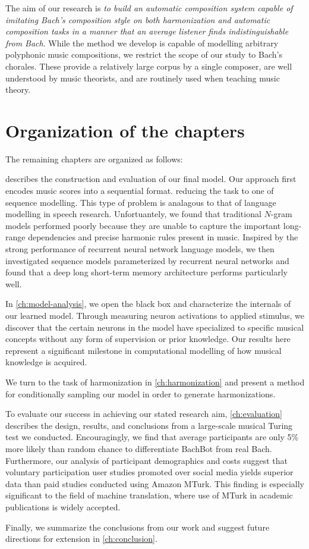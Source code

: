 The aim of our research is \emph{to build an automatic composition system
capable of imitating Bach's composition style on both harmonization and
automatic composition tasks in a manner that an average listener finds
indistinguishable from Bach}. While the method we develop is capable of
modelling arbitrary polyphonic music compositions, we restrict the scope of our
study to Bach's chorales. These provide a relatively large corpus by a single
composer, are well understood by music theorists, and are routinely used when
teaching music theory.

\section{Organization of the chapters}

The remaining chapters are organized as follows:

 describes the construction and evaluation of
our final model. Our approach first encodes music scores into a sequential
format. reducing the task to one of sequence modelling. This type of problem is
analagous to that of language modelling in speech research. Unfortuantely, we
found that traditional $N$-gram models performed poorly because they are unable
to capture the important long-range dependencies and precise harmonic rules
present in music. Inspired by the strong performance of recurrent neural
network language models, we then investigated sequence models parameterized by
recurrent neural networks and found that a deep long short-term memory
architecture performs particularly well.

In \vref{ch:model-analysis}, we open the black box and characterize the
internals of our learned model. Through measuring neuron activations to applied
stimulus, we discover that the certain neurons in the model have specialized to
specific musical concepts without any form of supervision or prior knowledge.
Our results here represent a significant milestone in computational modelling
of how musical knowledge is acquired.

We turn to the task of harmonization in \vref{ch:harmonization} and present a
method for conditionally sampling our model in order to generate
harmonizations.

To evaluate our success in achieving our stated research aim,
\vref{ch:evaluation} describes the design, results, and conclusions from a
large-scale musical Turing test we conducted. Encouragingly, we find that
average participants are only 5\% more likely than random chance to
differentiate BachBot from real Bach. Furthermore, our analysis of participant
demographics and costs suggest that voluntary participation user studies
promoted over social media yields superior data than paid studies conducted
using Amazon MTurk. This finding is especially significant to the field of
machine translation, where use of MTurk in academic publications is widely
accepted.

Finally, we summarize the conclusions from our work and suggest future directions
for extension in \vref{ch:conclusion}.
